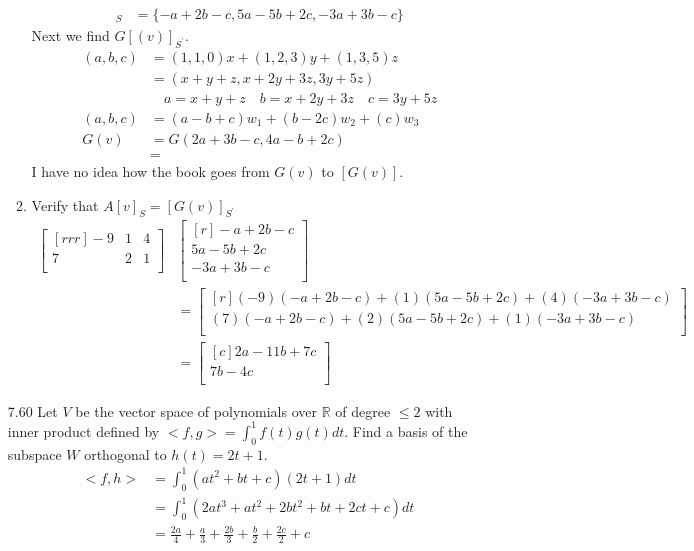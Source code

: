 \documentclass[12pt]{article}
\theoremstyle{definition}
\theoremstyle{plain}
\begin{document}
\begin{enumerate}
\begin{enumerate}
\begin{align*}
		[v]_S&=\{-a+2b-c,5a-5b+2c,-3a+3b-c\}
		\end{align*}
		Next we find $G[(v)]_{S^\prime}$.
		\begin{align*}
		(a,b,c)&=(1,1,0)x+(1,2,3)y+(1,3,5)z\\
		&= (x+y+z,x+2y+3z,3y+5z)\\
		&\quad a = x+y+z \quad b = x+2y+3z \quad c = 3y+5z\\		
		(a,b,c) &= (a-b+c)w_1+(b-2c)w_2+(c)w_3\\
		G(v) &= G(2a+3b-c,4a-b+2c)\\
		&=
		\end{align*}
		I have no idea how the book goes from $G(v)$ to $[G(v)]$.
	\item Verify that $A[v]_S=[G(v)]_{S^\prime}$
		\begin{align*}
		\begin{bmatrix}[rrr]-9&1&4\\7&2&1\\\end{bmatrix}&\begin{bmatrix}[r]-a+2b-c\\5a-5b+2c\\-3a+3b-c\\\end{bmatrix}\\
		&= \begin{bmatrix}[r](-9)(-a+2b-c)+(1)(5a-5b+2c)+(4)(-3a+3b-c)\\(7)(-a+2b-c)+(2)(5a-5b+2c)+(1)(-3a+3b-c)\\\end{bmatrix}\\
		&= \begin{bmatrix}[c]2a-11b+7c\\7b-4c\\\end{bmatrix}
		\end{align*}
	\end{enumerate}
\item[7.60]Let $V$ be the vector space of polynomials over $\mathbb{R}$ of degree $\leq 2$ with inner product defined by $<f,g>=\int_0^1f(t)g(t)dt$. Find a basis of the subspace $W$ orthogonal to $h(t)=2t+1$.\\
	\begin{align*}
	<f,h>&=\int_0^1(at^2+bt+c)(2t+1)dt\\
	&= \int_0^1(2at^3+at^2+2bt^2+bt+2ct+c)dt\\
	&= \frac{2a}{4}+\frac{a}{3}+\frac{2b}{3}+\frac{b}{2}+\frac{2c}{2}+c\\

\end{align*}
\end{enumerate}
\end{document}
